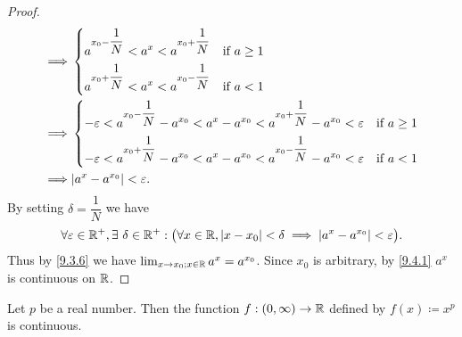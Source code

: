 \begin{proof}
\begin{align*}
    \implies & \begin{dcases}
                 a^{x_0 - \dfrac{1}{N}} < a^{x} < a^{x_0 + \dfrac{1}{N}} & \text{if } a \geq 1 \\
                 a^{x_0 + \dfrac{1}{N}} < a^{x} < a^{x_0 - \dfrac{1}{N}} & \text{if } a < 1
               \end{dcases}                                                          \\
    \implies & \begin{dcases}
                 -\varepsilon < a^{x_0 - \dfrac{1}{N}} - a^{x_0} < a^x - a^{x_0} < a^{x_0 + \dfrac{1}{N}} - a^{x_0} < \varepsilon & \text{if } a \geq 1 \\
                 -\varepsilon < a^{x_0 + \dfrac{1}{N}} - a^{x_0} < a^x - a^{x_0} < a^{x_0 - \dfrac{1}{N}} - a^{x_0} < \varepsilon & \text{if } a < 1
               \end{dcases} \\
    \implies & \abs{a^x - a^{x_0}} < \varepsilon.
  \end{align*}
  By setting \(\delta = \dfrac{1}{N}\) we have
  \[
    \forall \varepsilon \in \mathbb{R}^+, \exists\ \delta \in \mathbb{R}^+ : \big(\forall x \in \mathbb{R}, \left\lvert x - x_0\right\rvert < \delta \implies \left\lvert a^x - a^{x_0}\right\rvert < \varepsilon\big).
  \]
  Thus by \cref{9.3.6} we have \(\lim_{x \to x_0 ; x \in \mathbb{R}} a^x = a^{x_0}\).
  Since \(x_0\) is arbitrary, by \cref{9.4.1} \(a^x\) is continuous on \(\mathbb{R}\).
\end{proof}

\begin{prop}\label{9.4.11}
  Let \(p\) be a real number.
  Then the function \(f : (0, \infty) \to \mathbb{R}\) defined by \(f(x) \coloneqq x^p\) is continuous.
\end{prop}

